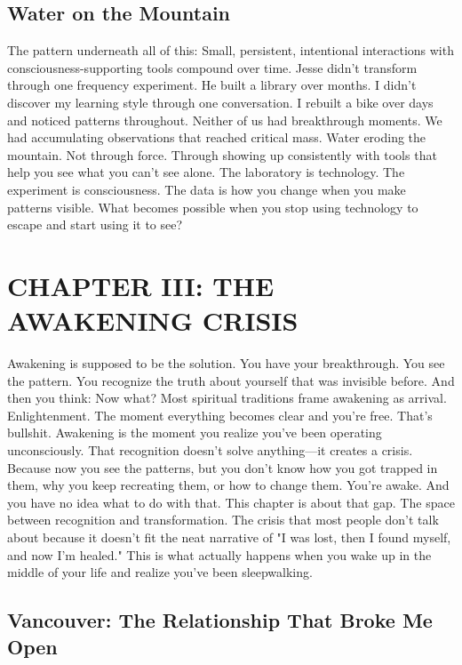 \documentclass[12pt,openany]{book}
\begin{document}
\section{Water on the Mountain}

The pattern underneath all of this:
Small, persistent, intentional interactions with consciousness-supporting tools compound over time.
Jesse didn't transform through one frequency experiment. He built a library over months.
I didn't discover my learning style through one conversation. I rebuilt a bike over days and noticed patterns throughout.
Neither of us had breakthrough moments. We had accumulating observations that reached critical mass.
Water eroding the mountain.
Not through force. Through showing up consistently with tools that help you see what you can't see alone.
The laboratory is technology. The experiment is consciousness. The data is how you change when you make patterns visible.
What becomes possible when you stop using technology to escape and start using it to see?

\cleardoublepage

\chapter{CHAPTER III: THE AWAKENING CRISIS}

Awakening is supposed to be the solution.
You have your breakthrough. You see the pattern. You recognize the truth about yourself that was invisible before.
And then you think: Now what?
Most spiritual traditions frame awakening as arrival. Enlightenment. The moment everything becomes clear and you're free.
That's bullshit.
Awakening is the moment you realize you've been operating unconsciously. That recognition doesn't solve anything—it creates a crisis. Because now you see the patterns, but you don't know how you got trapped in them, why you keep recreating them, or how to change them.
You're awake. And you have no idea what to do with that.
This chapter is about that gap. The space between recognition and transformation. The crisis that most people don't talk about because it doesn't fit the neat narrative of "I was lost, then I found myself, and now I'm healed."
This is what actually happens when you wake up in the middle of your life and realize you've been sleepwalking.

\section{Vancouver: The Relationship That Broke Me Open}
\end{document}
